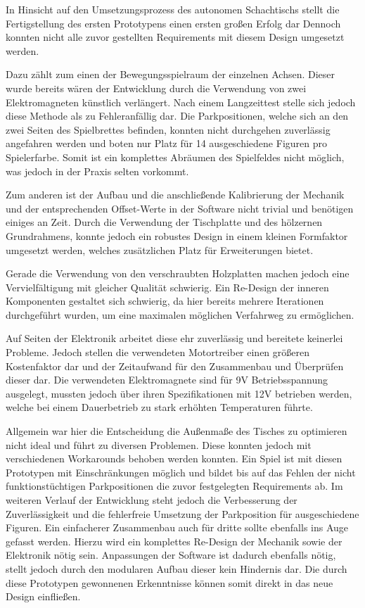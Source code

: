 In Hinsicht auf den Umsetzungsprozess des autonomen Schachtischs stellt
die Fertigstellung des ersten Prototypens einen ersten großen Erfolg dar
Dennoch konnten nicht alle zuvor gestellten Requirements mit diesem
Design umgesetzt werden.

Dazu zählt zum einen der Bewegungsspielraum der einzelnen Achsen. Dieser
wurde bereits wären der Entwicklung durch die Verwendung von zwei
Elektromagneten künstlich verlängert. Nach einem Langzeittest stelle
sich jedoch diese Methode als zu Fehleranfällig dar. Die Parkpositionen,
welche sich an den zwei Seiten des Spielbrettes befinden, konnten nicht
durchgehen zuverlässig angefahren werden und boten nur Platz für 14
ausgeschiedene Figuren pro Spielerfarbe. Somit ist ein komplettes
Abräumen des Spielfeldes nicht möglich, was jedoch in der Praxis selten
vorkommt.

Zum anderen ist der Aufbau und die anschließende Kalibrierung der
Mechanik und der entsprechenden Offset-Werte in der Software nicht
trivial und benötigen einiges an Zeit. Durch die Verwendung der
Tischplatte und des hölzernen Grundrahmens, konnte jedoch ein robustes
Design in einem kleinen Formfaktor umgesetzt werden, welches
zusätzlichen Platz für Erweiterungen bietet.

Gerade die Verwendung von den verschraubten Holzplatten machen jedoch
eine Vervielfältigung mit gleicher Qualität schwierig. Ein Re-Design der
inneren Komponenten gestaltet sich schwierig, da hier bereits mehrere
Iterationen durchgeführt wurden, um eine maximalen möglichen Verfahrweg
zu ermöglichen.

Auf Seiten der Elektronik arbeitet diese ehr zuverlässig und bereitete
keinerlei Probleme. Jedoch stellen die verwendeten Motortreiber einen
größeren Kostenfaktor dar und der Zeitaufwand für den Zusammenbau und
Überprüfen dieser dar. Die verwendeten Elektromagnete sind für 9V
Betriebsspannung ausgelegt, mussten jedoch über ihren Spezifikationen
mit 12V betrieben werden, welche bei einem Dauerbetrieb zu stark
erhöhten Temperaturen führte.

Allgemein war hier die Entscheidung die Außenmaße des Tisches zu
optimieren nicht ideal und führt zu diversen Problemen. Diese konnten
jedoch mit verschiedenen Workarounds behoben werden konnten. Ein Spiel
ist mit diesen Prototypen mit Einschränkungen möglich und bildet bis auf
das Fehlen der nicht funktionstüchtigen Parkpositionen die zuvor
festgelegten Requirements ab. Im weiteren Verlauf der Entwicklung steht
jedoch die Verbesserung der Zuverlässigkeit und die fehlerfreie
Umsetzung der Parkposition für ausgeschiedene Figuren. Ein einfacherer
Zusammenbau auch für dritte sollte ebenfalls ins Auge gefasst werden.
Hierzu wird ein komplettes Re-Design der Mechanik sowie der Elektronik
nötig sein. Anpassungen der Software ist dadurch ebenfalls nötig, stellt
jedoch durch den modularen Aufbau dieser kein Hindernis dar. Die durch
diese Prototypen gewonnenen Erkenntnisse können somit direkt in das neue
Design einfließen.

